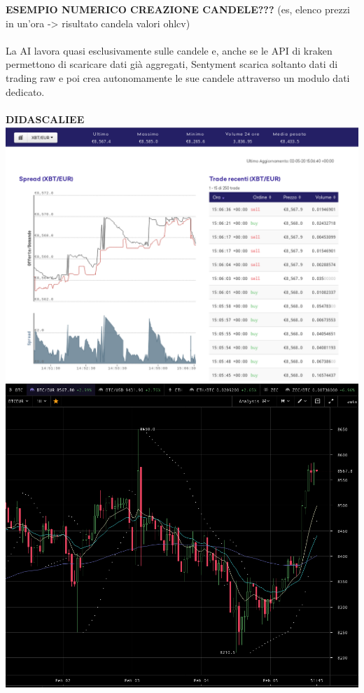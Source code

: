 \documentclass{article}
\begin{document}
		
		\textbf{ESEMPIO NUMERICO CREAZIONE CANDELE???}
		(es, elenco prezzi in un'ora -> risultato candela valori ohlcv)
		\\~\\
		
		La AI lavora quasi esclusivamente sulle candele e, anche se le API di kraken permettono di scaricare dati già aggregati, Sentyment scarica soltanto dati di trading raw e poi crea autonomamente le sue candele attraverso un modulo dati dedicato.
		\\~\\
		
		\textbf{DIDASCALIEE}
		\includegraphics[width=\linewidth]{kraken_raw}
		\includegraphics[width=\linewidth]{kraken_ohlcv}
		
\end{document}
